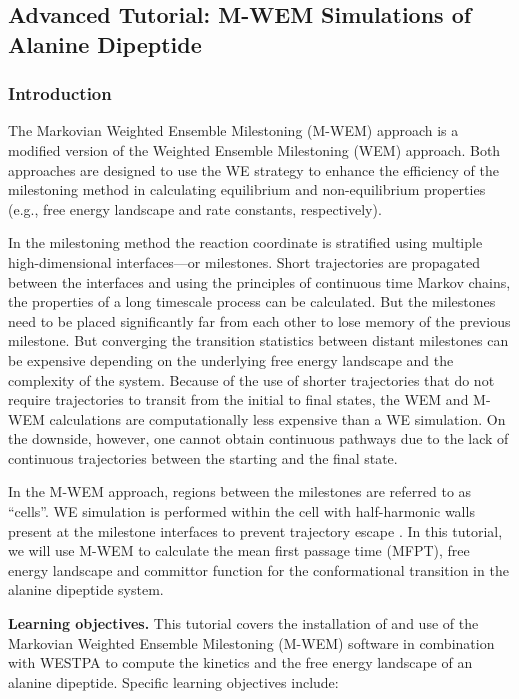 \subsection{Advanced Tutorial: M-WEM Simulations of Alanine Dipeptide}
\label{tut:wem-adv}

\subsubsection{Introduction}

The Markovian Weighted Ensemble Milestoning (M-WEM) approach \citep{Ray2022Markovian} is a modified version of the Weighted Ensemble Milestoning (WEM) \citep{Ray2020Kinetics,Ray2020Weighted} approach. 
Both approaches are designed to use the WE strategy to enhance the efficiency of the milestoning method in calculating equilibrium and non-equilibrium properties (e.g., free energy landscape and rate constants, respectively). 

In the milestoning method \citep{Faradjian2004Computing,West2007Extending} the reaction coordinate is stratified using multiple high-dimensional interfaces---or milestones. 
Short trajectories are propagated between the interfaces and using the principles of continuous time Markov chains, the properties of a long timescale process can be calculated. 
But the milestones need to be placed significantly far from each other to lose memory of the previous milestone. 
But converging the transition statistics between distant milestones can be expensive depending on the underlying free energy landscape and the complexity of the system. 
Because of the use of shorter trajectories that do not require trajectories to transit from the initial to final states, the WEM and M-WEM calculations are computationally less expensive than a WE simulation. 
On the downside, however, one cannot obtain continuous pathways due to the lack of continuous trajectories between the starting and the final state. 

In the M-WEM approach, regions between the milestones are referred to as “cells”.
WE simulation is performed within the cell with half-harmonic walls present at the milestone interfaces to prevent trajectory escape \citep{Vanden-Eijnden2009Markovian, Maragliano2009Free, Ray2022Markovian}. 
In this tutorial, we will use M-WEM to calculate the mean first passage time (MFPT), free energy landscape and committor function for the conformational transition in the alanine dipeptide system.

\textbf{Learning objectives.} This tutorial covers the installation of and use of the Markovian Weighted Ensemble Milestoning (M-WEM) software in combination with WESTPA to compute the kinetics and the free energy landscape of an alanine dipeptide. 
Specific learning objectives include:

